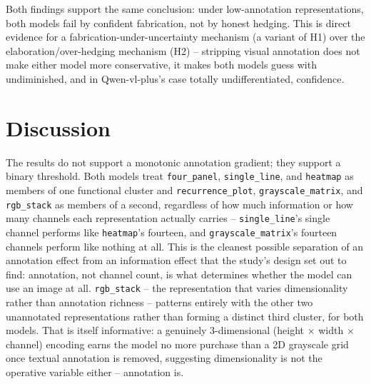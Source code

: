 \documentclass[11pt]{article}
\begin{document}
Both findings support the same conclusion: under low-annotation representations, both models fail by
confident fabrication, not by honest hedging. This is direct evidence for a fabrication-under-uncertainty
mechanism (a variant of H1) over the elaboration/over-hedging mechanism (H2) -- stripping visual
annotation does not make either model more conservative, it makes both models guess with undiminished,
and in Qwen-vl-plus's case totally undifferentiated, confidence.

\section{Discussion}
\label{sec:discussion}

The results do not support a monotonic annotation gradient; they support a binary threshold. Both
models treat \texttt{four\_panel}, \texttt{single\_line}, and \texttt{heatmap} as members of one
functional cluster and \texttt{recurrence\_plot}, \texttt{grayscale\_matrix}, and \texttt{rgb\_stack}
as members of a second, regardless of how much information or how many channels each representation
actually carries -- \texttt{single\_line}'s single channel performs like \texttt{heatmap}'s fourteen,
and \texttt{grayscale\_matrix}'s fourteen channels perform like nothing at all. This is the cleanest
possible separation of an annotation effect from an information effect that the study's design set
out to find: annotation, not channel count, is what determines whether the model can use an image at
all. \texttt{rgb\_stack} -- the representation that varies dimensionality rather than annotation
richness -- patterns entirely with the other two unannotated representations rather than forming a
distinct third cluster, for both models. That is itself informative: a genuinely 3-dimensional
(height $\times$ width $\times$ channel) encoding earns the model no more purchase than a 2D grayscale
grid once textual annotation is removed, suggesting dimensionality is not the operative variable
either -- annotation is.
\end{document}
